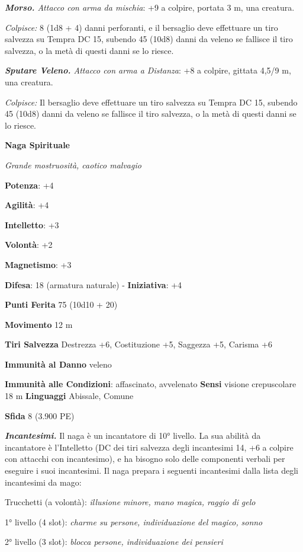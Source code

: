 \begin{multicols}{2}
\emph{\textbf{Morso.} Attacco con arma da mischia}: +9 a colpire,
portata 3 m, una creatura.

\emph{Colpisce:} 8 (1d8 + 4) danni perforanti, e il bersaglio deve
effettuare un tiro salvezza su Tempra DC 15, subendo 45 (10d8)
danni da veleno se fallisce il tiro salvezza, o la metà di questi danni
se lo riesce.

\emph{\textbf{Sputare Veleno.} Attacco con arma a Distanza}: +8 a
colpire, gittata 4,5/9 m, una creatura.

\emph{Colpisce:} Il bersaglio deve effettuare un tiro salvezza su Tempra DC 15, subendo 45 (10d8) danni da veleno se fallisce il
tiro salvezza, o la metà di questi danni se lo riesce.

\textbf{Naga Spirituale}

\emph{Grande mostruosità, caotico malvagio}

\textbf{Potenza}: +4

\textbf{Agilità}: +4

\textbf{Intelletto}: +3

\textbf{Volontà}: +2

\textbf{Magnetismo}: +3

\textbf{Difesa}: 18 (armatura naturale) - \textbf{Iniziativa}: +4

\textbf{Punti Ferita} 75 (10d10 + 20)

\textbf{Movimento} 12 m

\textbf{Tiri Salvezza} Destrezza +6, Costituzione +5, Saggezza +5,
Carisma +6

\textbf{Immunità al Danno} veleno

\textbf{Immunità alle Condizioni}: affascinato, avvelenato \textbf{Sensi}
visione crepuscolare 18 m \textbf{Linguaggi} Abissale,
Comune

\textbf{Sfida} 8 (3.900 PE)\smallskip

\emph{\textbf{Incantesimi.}} Il naga è un incantatore di 10° livello. La
sua abilità da incantatore è l'Intelletto (DC dei tiri salvezza degli
incantesimi 14, +6 a colpire con attacchi con incantesimo), e ha bisogno
solo delle componenti verbali per eseguire i suoi incantesimi. Il naga
prepara i seguenti incantesimi dalla lista degli incantesimi da mago:

Trucchetti (a volontà): \emph{illusione minore, mano magica, raggio di}
\emph{gelo}

1° livello (4 slot): \emph{charme su persone, individuazione del
magico,} \emph{sonno}

2° livello (3 slot): \emph{blocca persone, individuazione dei pensieri}


\end{multicols}
